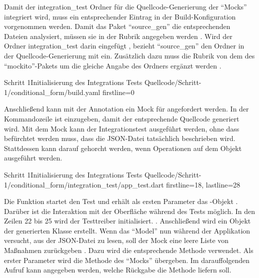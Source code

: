 Damit der integration_test Ordner für die Quellcode-Generierung der \enquote{Mocks} integriert wird, muss ein entsprechender Eintrag in der Build-Konfiguration vorgenommen werden.
Damit das Paket \enquote{source_gen} die entsprechenden Dateien analysiert, müssen sie in der Rubrik  angegeben werden .
Wird der Ordner integration_test darin eingefügt , bezieht \enquote{source_gen} den Ordner in der Quellcode-Generierung mit ein.
Zusätzlich dazu muss die Rubrik  von dem  des \enquote{mockito}-Pakets  um die gleiche Angabe des Ordners ergänzt werden .

\begin{alexyamllisting}{Schritt 1}{Initialisierung des Integrations Tests}
  {Quellcode/Schritt-1/conditional_form/build.yaml}
  {firstline=0}
  \label{lst:Schritt1IntegrationsTestInitialisierung}
\end{alexyamllisting}

Anschließend kann mit der Annotation   ein Mock für  angefordert werden.
In der Kommandozeile ist  einzugeben, damit der entsprechende Quellcode generiert wird.
Mit dem Mock kann der Integrationstest ausgeführt werden, ohne dass befürchtet werden muss, dass die JSON-Datei tatsächlich beschrieben wird.
Stattdessen kann darauf gehorcht werden, wenn Operationen auf dem Objekt ausgeführt werden. 

\begin{alexlisting}{Schritt 1}{Initialisierung des Integrations Tests}
  {Quellcode/Schritt-1/conditional_form/integration_test/app_test.dart}
  {firstline=18, lastline=28}
  \label{lst:Schritt1IntegrationsTestInitialisierung}
\end{alexlisting}

Die Funktion  startet den Test und erhält als ersten Parameter das -Objekt .
Darüber ist die Interaktion mit der Oberfläche während des Tests möglich.
In den Zeilen 22 bis 25 wird der Testtreiber initialisiert. . Anschließend wird ein Objekt der generierten Klasse  erstellt. Wenn das \enquote{Model} nun während der Applikation versucht, aus der JSON-Datei zu lesen, soll der Mock eine leere Liste von Maßnahmen zurückgeben . Dazu wird die entsprechende Methode  verwendet. Als erster Parameter wird die Methode  des \enquote{Mocks} übergeben. Im darauffolgenden Aufruf  kann angegeben werden, welche Rückgabe die Methode liefern soll.

